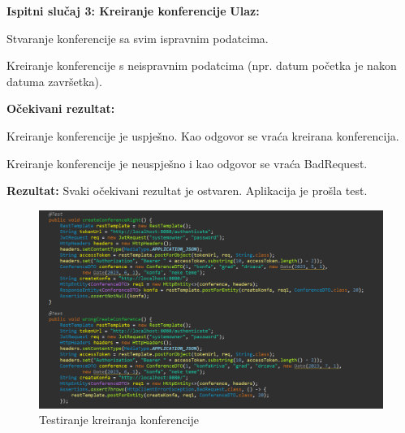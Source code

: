    \textbf{\newline Ispitni slučaj 3: Kreiranje konferencije \newline}
   \textbf{Ulaz:}
   \begin{packed_item}
   \item[] \begin{packed_enum}
				
				\item Stvaranje konferencije sa svim ispravnim podatcima.
    \item Kreiranje konferencije s neispravnim podatcima (npr. datum početka je nakon datuma završetka).
				
			\end{packed_enum}
   \end{packed_item}

   \textbf{Očekivani rezultat:}
   \begin{packed_item}
   \item[] \begin{packed_enum}
				
				\item Kreiranje konferencije je uspješno. Kao odgovor se vraća kreirana konferencija.
    \item Kreiranje konferencije je neuspješno i kao odgovor se vraća BadRequest.
				
			\end{packed_enum}
   \end{packed_item}
   \textbf{Rezultat:} \text Svaki očekivani rezultat je ostvaren. \color{red} Aplikacija je prošla test. \color{black}

    \begin{figure}[H]
            \includegraphics[scale=0.55]{slike/conf_test.png} %
			
			\centering
			\caption{Testiranje kreiranja konferencije}
			\label{fig:test kreiranja konferencije}
			\end{figure}

